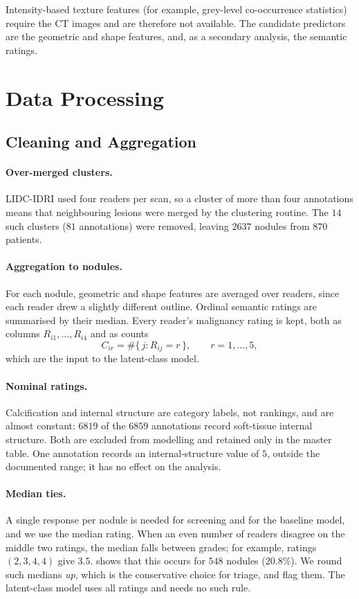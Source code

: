 \documentclass[12pt]{article}
\begin{document}
Intensity-based texture features (for example, grey-level
co-occurrence statistics) require the CT images and are therefore
not available. The candidate predictors are the geometric and
shape features, and, as a secondary analysis, the semantic
ratings.

\section{Data Processing}
\label{sec:processing}

\subsection{Cleaning and Aggregation}

\paragraph{Over-merged clusters.}
LIDC-IDRI used four readers per scan, so a cluster of more than
four annotations means that neighbouring lesions were merged by
the clustering routine. The $14$ such clusters ($81$ annotations)
were removed, leaving $2637$ nodules from $870$ patients.

\paragraph{Aggregation to nodules.}
For each nodule, geometric and shape features are averaged over
readers, since each reader drew a slightly different outline.
Ordinal semantic ratings are summarised by their median. Every
reader's malignancy rating is kept, both as columns
$R_{i1},\dots,R_{i4}$ and as counts
\[
  C_{ir} = \#\{\, j : R_{ij} = r \,\}, \qquad r = 1,\dots,5,
\]
which are the input to the latent-class model.

\paragraph{Nominal ratings.}
Calcification and internal structure are category labels, not
rankings, and are almost constant: $6819$ of the $6859$
annotations record soft-tissue internal structure. Both are
excluded from modelling and retained only in the master table.
One annotation records an internal-structure value of $5$,
outside the documented range; it has no effect on the analysis.

\paragraph{Median ties.}
A single response per nodule is needed for screening and for the
baseline model, and we use the median rating. When an even
number of readers disagree on the middle two ratings, the median
falls between grades; for example, ratings $(2,3,4,4)$ give
$3.5$.  shows that this occurs for $548$ nodules
($20.8\%$). We round such medians \emph{up}, which is the
conservative choice for triage, and flag them. The latent-class
model uses all ratings and needs no such rule.
\end{document}
